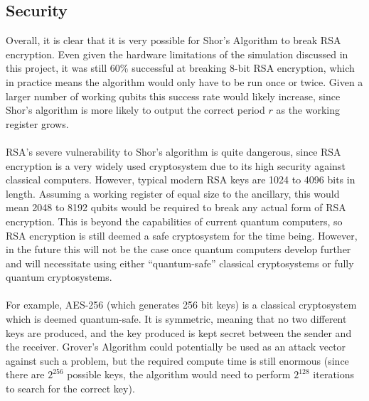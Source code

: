 \documentclass{article}[11pt]
\begin{document}
\subsection{Security}
Overall, it is clear that it is very possible for Shor's Algorithm to break RSA encryption. Even given the hardware limitations of the simulation discussed in this project, it was still 60\% successful at breaking 8-bit RSA encryption, which in practice means the algorithm would only have to be run once or twice. Given a larger number of working qubits this success rate would likely increase, since Shor's algorithm is more likely to output the correct period $r$ as the working register grows.\cite{candela}\\
\\
RSA's severe vulnerability to Shor's algorithm is quite dangerous, since RSA encryption is a very widely used cryptosystem due to its high security against classical computers.\cite{RSAattack} However, typical modern RSA keys are 1024 to 4096 bits in length.\cite{nist} Assuming a working register of equal size to the ancillary, this would mean 2048 to 8192 qubits would be required to break any actual form of RSA encryption.\cite{candela,shorcircuit} This is beyond the capabilities of current quantum computers, so RSA encryption is still deemed a safe cryptosystem for the time being. However, in the future this will not be the case once quantum computers develop further and will necessitate using either ``quantum-safe'' classical cryptosystems or fully quantum cryptosystems.\\
\\
For example, AES-256 (which generates 256 bit keys) is a classical cryptosystem which is deemed quantum-safe.\cite{ETSI_threat_assess} It is symmetric, meaning that no two different keys are produced, and the key produced is kept secret between the sender and the receiver. Grover's Algorithm could potentially be used as an attack vector against such a problem, but the required compute time is still enormous (since there are $2^{256}$ possible keys, the algorithm would need to perform $2^{128}$ iterations to search for the correct key).\cite{ETSI_threat_assess} \\
\\
\end{document}

